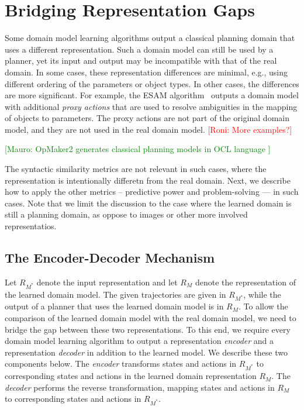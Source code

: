 \documentclass{article}
\theoremstyle{definition}
\theoremstyle{remark}
\newcommand{\realm}{\ensuremath{M^*}\xspace}
\newcommand{\roni}[1]{{\textcolor{red}{[Roni: #1]}}}
\newcommand{\mauro}[1]{{\textcolor{green}{[Mauro: #1]}}}
\begin{document}
\section{Bridging Representation Gaps}
\label{sec:bridging-gap}
Some domain model learning algorithms output a classical planning domain that uses a different representation. Such a domain model can still be used by a planner, yet its input and output may be incompatible with that of the real domain. 
In some cases, these representation differences are minimal, e.g., using  different ordering of the parameters or object types. 
In other cases, the differences are more significant. 
For example, the ESAM algorithm~\citep{juba2021safe} outputs a domain model with additional \emph{proxy actions} that are used to resolve ambiguities in the mapping of objects to parameters.
The proxy actions are not part of the original domain model, and they are not used in the real domain model. 
\roni{More examples?}

\mauro{OpMaker2 generates classical planning models in OCL language \cite{mccluskey2010action}}

The syntactic similarity metrics are not relevant in such cases, where the representation is intentionally differetn from the real domain. Next, we describe how to apply the other metrics -- predictive power and problem-solving --- in such cases. 
Note that we limit the discussion to the case where the learned domain is still a planning domain, as oppose to images or other more involved representatios. 

\subsection{The Encoder-Decoder Mechanism}
Let $R_{\realm}$ denote the input representation and let $R_M$ denote the representation of the learned domain model. 
The given trajectories are given in $R_{\realm}$, 
while the output of a planner that uses the learned domain model is in $R_M$. 
To allow the comparison of the learned domain model with the real domain model, we need to bridge the gap between these two representations. 
To this end, we require every domain model learning algorithm to output 
a representation \emph{encoder} and a representation \emph{decoder} in addition to the learned model. We describe these two components below.  
The \emph{encoder} transforms states and actions in $R_{\realm}$ to corresponding states and actions in the learned domain representation $R_M$. 
The \emph{decoder} performs the reverse transformation, mapping states and actions in $R_M$ to corresponding states and actions in $R_\realm$.
\end{document}
